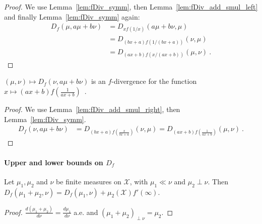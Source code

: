 \begin{proof}%
{}
We use Lemma~\ref{lem:fDiv_symm}, then Lemma~\ref{lem:fDiv_add_smul_left} and finally Lemma~\ref{lem:fDiv_symm} again:
\begin{align*}
D_f(\mu, a \mu + b \nu)
&= D_{xf(1/x)}(a \mu + b \nu, \mu)
\\
&= D_{(bx+a)f(1/(bx+a))}(\nu, \mu)
\\
&= D_{(ax+b)f(x/(ax+b))}(\mu, \nu)
\: .
\end{align*}

\end{proof}


\begin{lemma}
  \label{lem:fDiv_add_smul_right'}
  $(\mu, \nu) \mapsto D_f(\nu, a \mu + b \nu)$ is an $f$-divergence for the function $x \mapsto (ax+b)f\left(\frac{1}{ax+b}\right)$~.
\end{lemma}

\begin{proof}%
{}
We use Lemma~\ref{lem:fDiv_add_smul_right}, then Lemma~\ref{lem:fDiv_symm}.
\begin{align*}
D_f(\nu, a \mu + b \nu)
&= D_{(bx+a)f\left(\frac{x}{bx+a}\right)}(\nu, \mu)
= D_{(ax+b)f\left(\frac{1}{ax+b}\right)}(\mu, \nu)
\: .
\end{align*}
\end{proof}



\paragraph{Upper and lower bounds on $D_f$}

\begin{lemma}
  \label{lem:fDiv_absolutelyContinuous_add_mutuallySingular}
  \leanok
  Let $\mu_1, \mu_2$ and $\nu$ be finite measures on $\mathcal X$, with $\mu_1 \ll \nu$ and $\mu_2 \perp \nu$.
  Then $D_f(\mu_1 + \mu_2, \nu) = D_f(\mu_1, \nu) + \mu_2(\mathcal X) f'(\infty)$.
\end{lemma}

\begin{proof}\leanok
$\frac{d(\mu_1 + \mu_2)}{d \nu} = \frac{d \mu_1}{d \nu}$ a.e. and $(\mu_1 + \mu_2)_{\perp \nu} = \mu_2$.
\end{proof}

